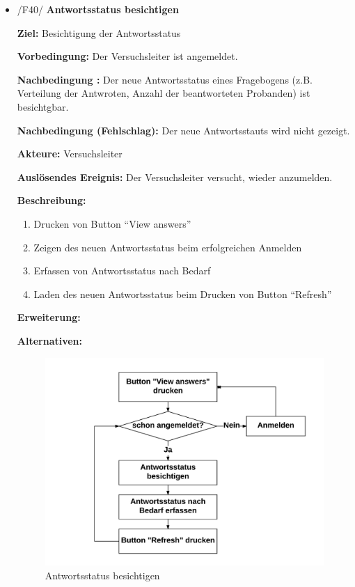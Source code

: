 \documentclass[a4paper]{scrreprt}
\begin{document}
\begin{itemize}
                	
	            \item /F40/ \textbf{Antwortsstatus besichtigen}
	            	\par \textbf{Ziel: }Besichtigung der Antwortsstatus
                    \par \textbf{Vorbedingung: }Der Versuchsleiter ist angemeldet.
                    \par \textbf{Nachbedingung : }Der neue Antwortsstatus eines Fragebogens (z.B. Verteilung der Antwroten, Anzahl der beantworteten Probanden) ist besichtgbar.
                    \par \textbf{Nachbedingung (Fehlschlag): }Der neue Antwortsstauts wird nicht gezeigt.
                    \par \textbf{Akteure: }Versuchsleiter
                    \par \textbf{Auslösendes Ereignis: }Der Versuchsleiter versucht, wieder anzumelden.
                    \par \textbf{Beschreibung: }
                        \begin{enumerate}
                           \item Drucken von Button ``View answers''
                           \item Zeigen des neuen Antwortsstatus beim erfolgreichen Anmelden
                           \item Erfassen von Antwortsstatus nach Bedarf
                           \item Laden des neuen Antwortsstatus beim Drucken von Button ``Refresh''
                        \end{enumerate}
                    \par \textbf{Erweiterung: }
                    \par \textbf{Alternativen: }
                        \newpage
                        \begin{figure}[ht]
                            \centering
                            \includegraphics[scale=0.8]{Antwortsstatus_besichtigen.jpeg}
                            \caption{Antwortsstatus besichtigen}
                        \end{figure}



\end{itemize}
\end{document}
